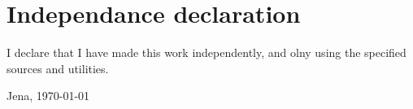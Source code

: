 \begingroup
\newpage
\thispagestyle{plain}
\section*{Independance declaration}

I declare that I have made this work independently, and olny using the specified
sources and utilities.


\vspace{4\baselineskip}


Jena, \today
\endgroup


